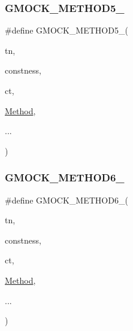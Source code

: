\subsubsection{\texorpdfstring{GMOCK\_METHOD5\_}{GMOCK\_METHOD5\_}}
{\footnotesize\ttfamily \#define G\+M\+O\+C\+K\+\_\+\+M\+E\+T\+H\+O\+D5\+\_\+(\begin{DoxyParamCaption}\item[{}]{tn,  }\item[{}]{constness,  }\item[{}]{ct,  }\item[{}]{\mbox{\hyperlink{_obj__test_2lib_2googletest-release-1_88_81_2googlemock_2test_2gmock-spec-builders__test_8cc_a95606368148f3e5aab5db46c32466afd}{Method}},  }\item[{}]{... }\end{DoxyParamCaption})}

\mbox{\label{googletest-master_2googlemock_2include_2gmock_2gmock-generated-function-mockers_8h_ad0ca7f6973a076d0af4c953f8ed91842}} 
\subsubsection{\texorpdfstring{GMOCK\_METHOD6\_}{GMOCK\_METHOD6\_}}
{\footnotesize\ttfamily \#define G\+M\+O\+C\+K\+\_\+\+M\+E\+T\+H\+O\+D6\+\_\+(\begin{DoxyParamCaption}\item[{}]{tn,  }\item[{}]{constness,  }\item[{}]{ct,  }\item[{}]{\mbox{\hyperlink{_obj__test_2lib_2googletest-release-1_88_81_2googlemock_2test_2gmock-spec-builders__test_8cc_a95606368148f3e5aab5db46c32466afd}{Method}},  }\item[{}]{... }\end{DoxyParamCaption})}

\mbox{\label{googletest-master_2googlemock_2include_2gmock_2gmock-generated-function-mockers_8h_ab98a8399ba62b53b375c2807f4d39d2f}} 
